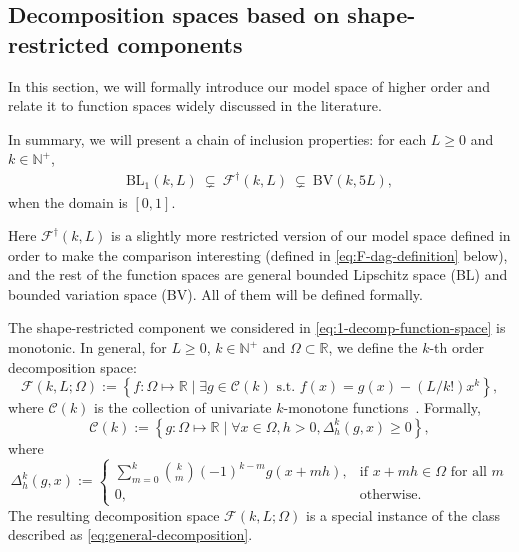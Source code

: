 \documentclass[12pt]{article}
\begin{document}
\subsection{Decomposition spaces based on shape-restricted components}\label{subsec:decomposition}
In this section, we will formally introduce our model space of higher order and relate it to function spaces widely discussed in the literature. 

In summary, we will present a chain of inclusion properties: for each $L\ge0$ and $k\in\mathbb{N}^+$,
\begin{align*}
    \mathrm{BL}_1(k, L) ~\subsetneq~\mathcal{F}^\dag(k, L)~\subsetneq~ \mathrm{BV}(k, 5L),
\end{align*}
when the domain is $[0,1]$.

Here $\mathcal{F}^\dag(k, L)$ is a slightly more restricted version of our model space defined in order to make the comparison interesting (defined in \eqref{eq:F-dag-definition} below), and the rest of the function spaces are 
general bounded Lipschitz space (BL) and bounded variation space (BV). All of them will be defined formally.

The shape-restricted component we considered in \eqref{eq:1-decomp-function-space} is monotonic. In general, for $L\ge0$, $k \in \mathbb{N}^+$ and $\Omega \subset \mathbb{R}$, we define the $k$-th order decomposition space:
\begin{equation}\label{eq:k-decomp-function-space}
\mathcal{F}(k, L;\Omega):=\left\{f:\Omega \mapsto \mathbb{R}\mid  \exists g \in \mathcal{C}(k) \text{ s.t. } f(x)=g(x)-(L / k!) x^k\right\},
\end{equation}
where $\mathcal{C}(k)$ is the collection of univariate $k$-monotone functions~\citep{chatterjee2015risk}. Formally,
\begin{equation*}
\mathcal{C}(k) :=\left\{g:\Omega\mapsto \mathbb{R}\mid  \forall x \in \Omega, h>0, \Delta_h^k(g, x) \geq 0\right\},
\end{equation*}
where
\begin{equation*}
\Delta_h^k(g, x):= 
\begin{cases}
\sum_{m=0}^k\binom{k}{m}(-1)^{k-m} g(x+m h), & \text{if } x + m h \in \Omega \text{ for all } m  \\
0, & \text{otherwise.}
\end{cases}
\end{equation*}
The resulting decomposition space $\mathcal{F}(k, L;\Omega)$ is a special instance of the class described as \eqref{eq:general-decomposition}.
\end{document}
